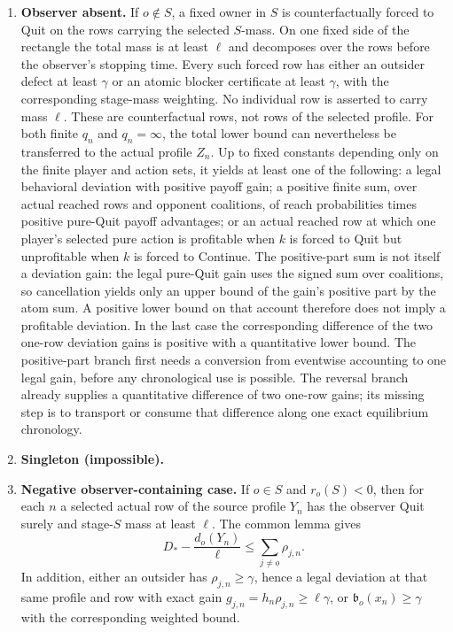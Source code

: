 \documentclass[11pt]{article}
\begin{document}
\begin{enumerate}
\item \textbf{Observer absent.}  If $o\notin S$, a fixed owner in $S$ is
      counterfactually forced to Quit on the rows carrying the selected
      $S$-mass.  On one fixed side of the rectangle the total mass is at
      least $\ell$ and decomposes over the rows before the observer's stopping
      time.  Every such forced row has either an outsider defect at least
      $\gamma$ or an atomic blocker certificate at least $\gamma$, with the
      corresponding stage-mass weighting.  No individual row is asserted to
      carry mass $\ell$.  These are counterfactual rows, not rows of the
      selected profile.  For both finite $q_n$ and $q_n=\infty$, the total
      lower bound can nevertheless be transferred to the actual profile
      $Z_n$.  Up to fixed constants depending only on the finite player and
      action sets, it yields at least one of the following: a legal behavioral
      deviation with positive payoff gain; a positive finite sum, over actual
      reached rows and opponent coalitions, of reach probabilities times
      positive pure-Quit payoff advantages; or an actual reached row at which
      one player's selected pure action is profitable when $k$ is forced to
      Quit but unprofitable when $k$ is forced to Continue.  The
      positive-part sum is not itself a deviation gain: the legal
      pure-Quit gain uses the signed sum over coalitions, so cancellation
      yields only an upper bound of the gain's positive part by the atom sum.
      A positive lower bound on that account therefore does not imply a
      profitable deviation.  In the last case the corresponding difference
      of the two one-row deviation gains is
      positive with a quantitative lower bound.  The positive-part branch
      first needs a conversion from eventwise accounting to one legal gain,
      before any chronological use is possible.  The reversal branch already
      supplies a quantitative difference of two one-row gains; its missing
      step is to transport or consume that difference along one exact
      equilibrium chronology.

\item \textbf{Singleton (impossible).}

\item \textbf{Negative observer-containing case.}  If $o\in S$ and
      $r_o(S)<0$, then for each $n$ a selected actual row of the source
      profile $Y_n$ has the observer Quit surely and stage-$S$ mass at least
      $\ell$.  The common lemma gives
      \[
       D_*-\frac{d_o(Y_n)}{\ell}
       \le\sum_{j\ne o}\rho_{j,n}.
      \]
      In addition, either an outsider has $\rho_{j,n}\ge\gamma$, hence a
      legal deviation at that same profile and row with exact gain
      $g_{j,n}=h_n\rho_{j,n}\ge\ell\gamma$, or
      $\mathfrak b_o(x_n)\ge\gamma$ with the corresponding weighted bound.


\end{enumerate}
\end{document}
